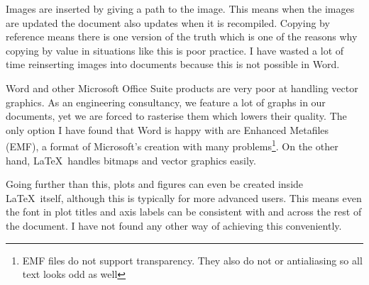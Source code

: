 Images are inserted by giving a path to the image. This means when the images are updated the document also updates when it is recompiled. Copying by reference means there is one version of the truth which is one of the reasons why copying by value in situations like this is poor practice. I have wasted a lot of time reinserting images into documents because this is not possible in Word.

Word and other Microsoft Office Suite products are very poor at handling vector graphics. As an engineering consultancy, we feature a lot of graphs in our documents, yet we are forced to rasterise them which lowers their quality. The only option I have found that Word is happy with are Enhanced Metafiles (EMF), a format of Microsoft's creation with many problems\footnote{EMF files do not support transparency. They also do not or antialiasing so all text looks odd as well}. On the other hand, \LaTeX\ handles bitmaps and vector graphics easily.

Going further than this, plots and figures can even be created inside \LaTeX\ itself, although this is typically for more advanced users. This means even the font in plot titles and axis labels can be consistent with and across the rest of the document. I have not found any other way of achieving this conveniently.